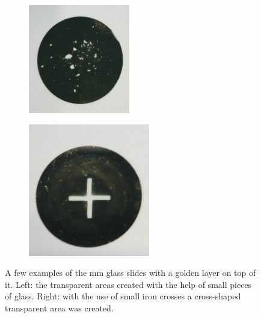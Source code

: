 \documentclass[twoside,single]{lion-msc}
\begin{document}
\begin{figure}
\begin{subfigure}{.5\textwidth}
  \centering
  \includegraphics[width=.7\linewidth]{glass}
  \label{cross}
\end{subfigure}%
\begin{subfigure}{.5\textwidth}
  \centering
  \includegraphics[width=.7\linewidth]{cross}
  \label{glass}
\end{subfigure}
\caption{A few examples of the  mm glass slides with a golden layer on top of it. Left: the transparent areas created with the help of small pieces of glass. Right: with the use of small iron crosses a cross-shaped transparent area was created.}
\label{gold_layer}
\end{figure}
\end{document}
